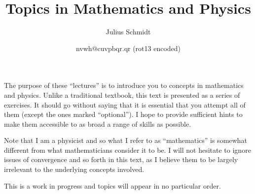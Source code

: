 \title{Topics in Mathematics and Physics}
\author{Julius Schmidt}
\date{nvwh@cuvpbqr.qr (rot13 encoded)}

\maketitle
The purpose of these ``lectures'' is to introduce you to concepts in mathematics and physics.
Unlike a traditional textbook, this text is presented as a series of exercises.
It should go without saying that it is essential that you attempt all of them (except the ones marked ``optional'').
I hope to provide sufficient hints to make them accessible to as broad a range of skills as possible.

Note that I am a physicist and so what I refer to as ``mathematics'' is somewhat different from what mathematicians consider it to be.
I will not hesitate to ignore issues of convergence and so forth in this text, as I believe them to be largely irrelevant to the underlying concepts involved.

This is a work in progress and topics will appear in no particular order.


